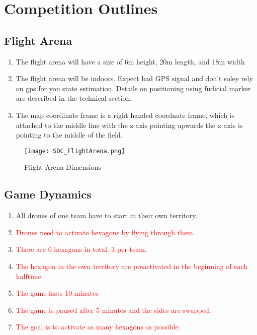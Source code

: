\section{Competition Outlines}

\subsection{Flight Arena}
\begin{enumerate}
	\item{The flight arena will have a size of 6m height, 20m length, and 18m width}
	\item{The flight arena will be indoors. Expect bad GPS signal and don't soley rely on gps for you state estimation. Details on positioning using fudicial marker are described in the technical section.}
	\item{The map coordinate frame is a right handed coordnate frame, which is attached to the middle line with the z axis pointing upwards the x axis is pointing to the middle of the field.}
\end{enumerate}
\begin{figure}[H]
	\centering
	\texttt{[image: SDC\_FlightArena.png]}
	\caption{Flight Arena Dimensions}
	\label{fig:flight_arena}
\end{figure}
\subsection{Game Dynamics}
\begin{enumerate}
	\item{All drones of one team have to start in their own territory.}
	\item{\textcolor{red}{Drones need to activate hexagons by flying through them.}}
	\item{\textcolor{red}{There are 6 hexagons in total. 3 per team.}}
	\item{\textcolor{red}{The hexagon in the own territory are preactivated in the beginning of each halftime}}
	\item{\textcolor{red}{The game lasts 10 minutes}}
	\item{\textcolor{red}{The game is paused after 5 minutes and the sides are swapped.}}
	\item{\textcolor{red}{The goal is to activate as many hexagons as possible.}}
\end{enumerate}

